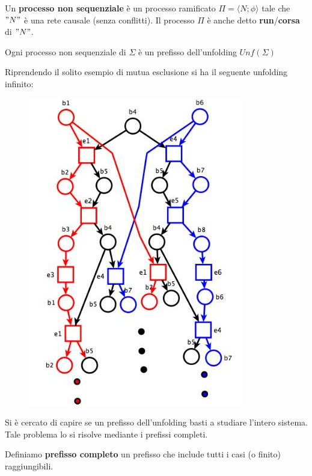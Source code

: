 \begin{definizione}
  Un \textbf{processo non sequenziale} è un processo ramificato
  $\Pi=\langle N;\phi\rangle$
  tale che $"N"$ è una rete causale (senza conflitti). Il processo $\Pi$ è anche
  detto \textbf{run}/\textbf{corsa} di $"N"$.
  \begin{corollario}
   Ogni processo non sequenziale di $\Sigma$ è un prefisso dell'unfolding $Unf(\Sigma)$
  \end{corollario}
\end{definizione}

\begin{esempio}
  Riprendendo il solito esempio di mutua esclusione si ha il seguente unfolding
  infinito:
  \begin{figure}[H]
    \centering
    \includegraphics[scale = 0.45]{img/unf.jpg} 
  \end{figure}
\end{esempio}
Si è cercato di capire se un prefisso dell'unfolding basti a studiare l'intero
sistema. Tale problema lo si risolve mediante i prefissi completi.
\begin{definizione}
  Definiamo \textbf{prefisso completo} un prefisso che include tutti i casi (o finito)
  raggiungibili.
\end{definizione} \vspace{5mm} %

